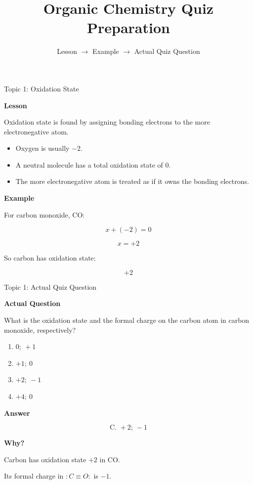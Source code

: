 \documentclass[aspectratio=169]{beamer}
\title{Organic Chemistry Quiz Preparation}
\subtitle{Lesson $\rightarrow$ Example $\rightarrow$ Actual Quiz Question}
\author{}
\date{}
\begin{document}
\begin{frame}
    \titlepage
\end{frame}

\begin{frame}[t]{Topic 1: Oxidation State}
\small

\textbf{Lesson}

Oxidation state is found by assigning bonding electrons to the more electronegative atom.

\begin{itemize}
    \setlength{\itemsep}{0.06cm}
    \item Oxygen is usually $-2$.
    \item A neutral molecule has a total oxidation state of $0$.
    \item The more electronegative atom is treated as if it owns the bonding electrons.
\end{itemize}

\vspace{0.1cm}

\textbf{Example}

For carbon monoxide, CO:

\[
x+(-2)=0
\]

\[
x=+2
\]

So carbon has oxidation state:

\[
\boxed{+2}
\]

\end{frame}

\begin{frame}[t]{Topic 1: Actual Quiz Question}
\scriptsize

\textbf{Actual Question}

What is the oxidation state and the formal charge on the carbon atom in carbon monoxide, respectively?

\vspace{0.08cm}

\begin{enumerate}
    \setlength{\itemsep}{0.04cm}
    \item[A.] $0;\ +1$
    \item[B.] $+1;\ 0$
    \item[C.] $+2;\ -1$
    \item[D.] $+4;\ 0$
\end{enumerate}

\vspace{0.08cm}

\textbf{Answer}

\[
\boxed{\text{C. } +2;\ -1}
\]

\vspace{-0.12cm}

\textbf{Why?}

Carbon has oxidation state $+2$ in CO.

Its formal charge in $:C\equiv O:$ is $-1$.

\end{frame}
\end{document}
